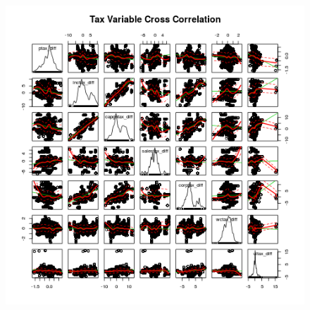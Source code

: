 \documentclass[12pt,a4paper]{article}
\begin{document}
\begin{figure}[h]\label{pairs}
    \centering
    \includegraphics[scale = 0.5]{../analysis/output/_--_pairs}
\end{figure}

\begin{landscape}

\end{landscape}
\restoregeometry

\begin{landscape}

\end{landscape}
\restoregeometry




\begin{landscape}

\end{landscape}
\restoregeometry

\begin{landscape}

\end{landscape}
\restoregeometry
\end{document}
